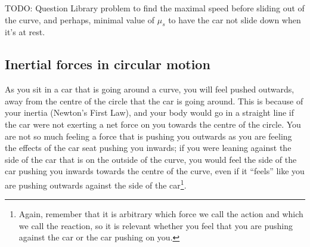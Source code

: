 TODO: Question Library problem to find the maximal speed before sliding out of the curve, and perhaps, minimal value of $\mu_s$ to have the car not slide down when it's at rest.

\subsection{Inertial forces in circular motion}
As you sit in a car that is going around a curve, you will feel pushed outwards, away from the centre of the circle that the car is going around. This is because of your inertia (Newton's First Law), and your body would go in a straight line if the car were not exerting a net force on you towards the centre of the circle. You are not so much feeling a force that is pushing you outwards as you are feeling the effects of the car seat pushing you inwards; if you were leaning against the side of the car that is on the outside of the curve, you would feel the side of the car pushing you inwards towards the centre of the curve, even if it ``feels'' like you are pushing outwards against the side of the car\footnote{Again, remember that it is arbitrary which force we call the action and which we call the reaction, so it is relevant whether you feel that you are pushing against the car or the car pushing on you.}.

